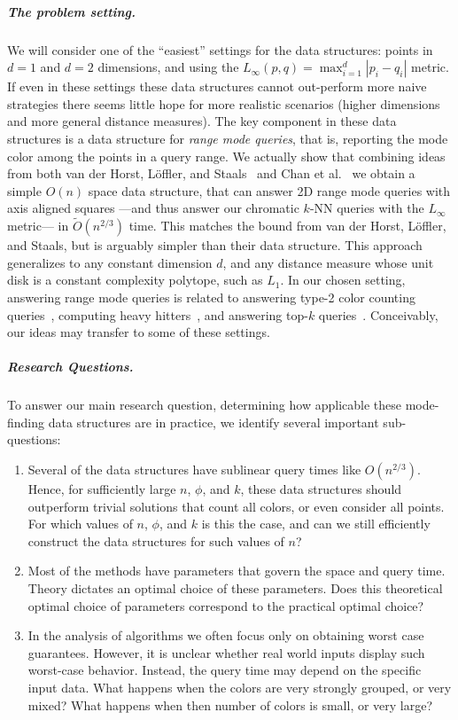 \documentclass[twoside,leqno,twocolumn]{article}
\newcommand{\etal}{et al.\xspace}
\begin{document}
\subparagraph{The problem setting.}  We will consider one of the ``easiest''
settings for the data structures: points in $d=1$ and $d=2$ dimensions, and using
the $L_\infty(p,q) = \max_{i=1}^d |p_i-q_i|$ metric. If even
in these settings these data structures cannot out-perform more naive
strategies there seems little hope for more realistic scenarios
(higher dimensions and more general distance measures). The key
component in these data structures is a data structure for \emph{range
  mode queries}, that is, reporting the mode color among the points in
a query range. We actually show that combining ideas from both van
der Horst, Löffler, and Staals~\cite{chromatic_knn2025} and Chan
\etal~\cite{chan2014modeQuery} we obtain a simple $O(n)$ space data
structure, that can answer 2D range mode queries with axis aligned
squares ---and thus answer our chromatic $k$-NN queries with the
$L_\infty$ metric--- in $\tilde{O}(n^{2/3})$ time. This matches the
bound from van der Horst, Löffler, and Staals, but is arguably simpler
than their data structure. This approach generalizes to any constant
dimension $d$, and any distance measure whose unit disk is a constant complexity polytope, such as $L_1$. In our chosen setting, answering range mode queries is
related to answering type-2 color counting queries~\cite{gupta1995colorReporting,janardan1993generalizedIntersectionSearching,gupta2018ColoredSearchingSurvey},
computing heavy hitters~\cite{misra1982finding}, and answering top-$k$
queries~\cite{yu2012processing,rahul2011efficient}. Conceivably, our ideas may transfer to some of
these settings.

\subparagraph{Research Questions.} To answer our main research
question, determining how applicable these mode-finding data
structures are in practice, we identify several important
sub-questions:

\begin{enumerate}
\item Several of the data structures have sublinear query times like
  $O(n^{2/3})$. Hence, for sufficiently large $n$, $\phi$, and $k$, these data
  structures should outperform trivial solutions that count all colors, or even
  consider all points. For which values of
  $n$, $\phi$, and $k$ is this the case, and can we still efficiently construct the data
  structures for such values of $n$?

\item Most of the methods have parameters that govern the space and
  query time. Theory dictates an optimal choice of these
  parameters. Does this theoretical optimal choice of parameters
  correspond to the practical optimal choice?

\item In the analysis of algorithms we often focus only on obtaining
  worst case guarantees. However, it is unclear whether real world
  inputs display such worst-case behavior. Instead, the query time may
  depend on the specific input data. What happens when the colors are
  very strongly grouped, or very mixed? What happens when then number
  of colors is small, or very large?
\end{enumerate}
\end{document}
